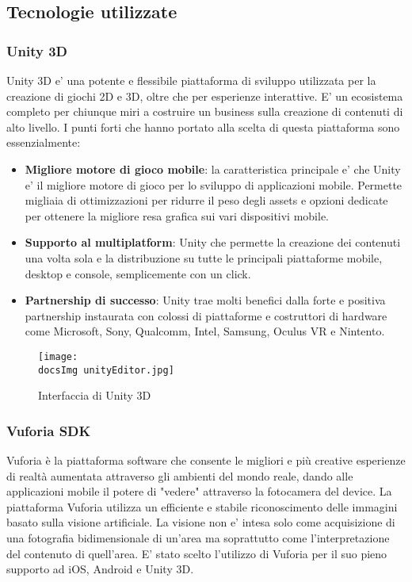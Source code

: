 \subsection{Tecnologie utilizzate}
\subsubsection{Unity 3D}
Unity 3D e' una potente e flessibile piattaforma di sviluppo utilizzata per la creazione di giochi 2D e 3D, oltre che per esperienze interattive. E' un ecosistema completo per chiunque miri a costruire un business sulla creazione di contenuti di alto livello. I punti forti che hanno portato alla scelta di questa piattaforma sono essenzialmente:
\begin{itemize}
	\item \textbf{Migliore motore di gioco mobile}: la caratteristica principale e' che Unity e' il migliore motore di gioco per lo sviluppo di applicazioni mobile. Permette migliaia di ottimizzazioni per ridurre il peso degli assets e opzioni dedicate per ottenere la migliore resa grafica sui vari dispositivi mobile.
	\item \textbf{Supporto al multiplatform}: Unity che permette la creazione dei contenuti una volta sola e la distribuzione su tutte le principali piattaforme mobile, desktop e console, semplicemente con un click.
	\item \textbf{Partnership di successo}: Unity trae molti benefici dalla forte e positiva partnership instaurata con colossi di piattaforme e costruttori di hardware come Microsoft, Sony, Qualcomm, Intel, Samsung, Oculus VR e Nintento.
\end{itemize}  

\begin{figure}[H]
	\centering
	\texttt{[image: \\docsImg unityEditor.jpg]}
	\caption{Interfaccia di Unity 3D}
	\label{fig: Interfaccia di Unity 3D}
\end{figure}

\subsubsection{Vuforia SDK}
Vuforia è la piattaforma software che consente le migliori e più creative esperienze di realtà aumentata attraverso gli ambienti del mondo reale, dando alle applicazioni mobile il potere di "vedere" attraverso la fotocamera del device.
La piattaforma Vuforia utilizza un efficiente e stabile riconoscimento delle immagini basato sulla visione artificiale. La visione non e' intesa solo come acquisizione di una fotografia bidimensionale di un'area ma soprattutto come l'interpretazione del contenuto di quell'area.
E' stato scelto l'utilizzo di Vuforia per il suo pieno supporto ad iOS, Android e Unity 3D.
\\

